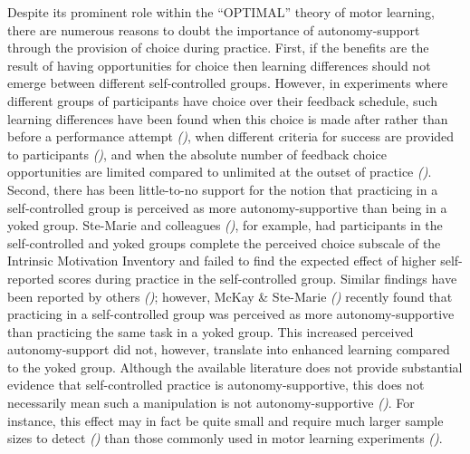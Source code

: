 \documentclass[
  english,
  jou]{apa7}
\begin{document}
Despite its prominent role within the ``OPTIMAL'' theory of motor learning, there are numerous reasons to doubt the importance of autonomy-support through the provision of choice during practice. First, if the benefits are the result of having opportunities for choice then learning differences should not emerge between different self-controlled groups. However, in experiments where different groups of participants have choice over their feedback schedule, such learning differences have been found when this choice is made after rather than before a performance attempt \emph{()}, when different criteria for success are provided to participants \emph{()}, and when the absolute number of feedback choice opportunities are limited compared to unlimited at the outset of practice \emph{()}. Second, there has been little-to-no support for the notion that practicing in a self-controlled group is perceived as more autonomy-supportive than being in a yoked group. Ste-Marie and colleagues \emph{()}, for example, had participants in the self-controlled and yoked groups complete the perceived choice subscale of the Intrinsic Motivation Inventory and failed to find the expected effect of higher self-reported scores during practice in the self-controlled group. Similar findings have been reported by others \emph{()}; however, McKay \& Ste-Marie \emph{()} recently found that practicing in a self-controlled group was perceived as more autonomy-supportive than practicing the same task in a yoked group. This increased perceived autonomy-support did not, however, translate into enhanced learning compared to the yoked group. Although the available literature does not provide substantial evidence that self-controlled practice is autonomy-supportive, this does not necessarily mean such a manipulation is not autonomy-supportive \emph{()}. For instance, this effect may in fact be quite small and require much larger sample sizes to detect \emph{()} than those commonly used in motor learning experiments \emph{()}.
\end{document}
